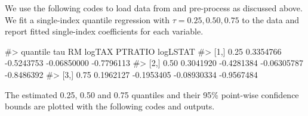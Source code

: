 We use the following codes to load data from  and pre-process as discussed above. We fit a single-index quantile regression with $\tau = 0.25,0.50,0.75$ to the data and report fitted single-index coefficients for each variable.
\begin{Schunk}
\begin{Soutput}
 #>      quantile tau        RM     logTAX     PTRATIO   logLSTAT
 #> [1,]         0.25 0.3354766 -0.5243753 -0.06850000 -0.7796113
 #> [2,]         0.50 0.3041920 -0.4281384 -0.06305787 -0.8486392
 #> [3,]         0.75 0.1962127 -0.1953405 -0.08930334 -0.9567484
\end{Soutput}
\end{Schunk}

The estimated 0.25, 0.50 and 0.75 quantiles and their 95\% point-wise confidence bounds are plotted with the following codes and outputs.  

